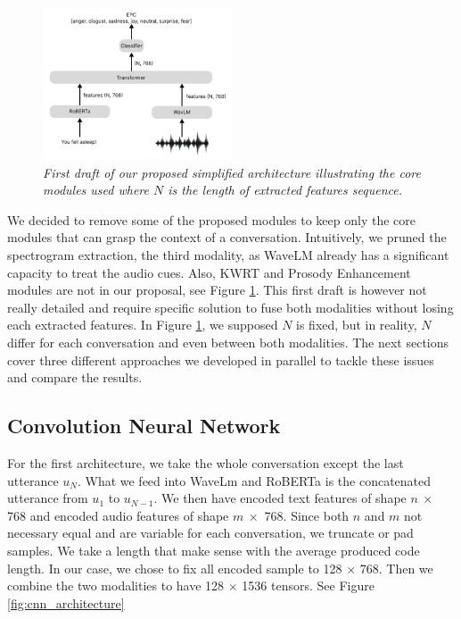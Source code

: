 \documentclass{article}
\begin{document}
\begin{figure}[htbp]
  \centering
  \includegraphics[width=0.5\textwidth]{Images/architecture_draft.png}
  \caption{\textit{First draft of our proposed simplified architecture illustrating the core modules used where $N$ is the length of extracted features sequence.}}
  \label{fig:DraftArchitecture}
\end{figure}

We decided to remove some of the proposed modules to keep only the core modules that can grasp the context of a conversation. Intuitively, we pruned the spectrogram extraction, the third modality, as WaveLM already has a significant capacity to treat the audio cues.
Also, KWRT and Prosody Enhancement modules are not in our proposal, see Figure \ref{fig:DraftArchitecture}. This first draft is however not really detailed and require specific solution to fuse both modalities without losing each extracted features. In Figure \ref{fig:DraftArchitecture}, we supposed $N$ is fixed, but in reality, $N$ differ for each conversation and even between both modalities. The next sections cover three different approaches we developed in parallel to tackle these issues and compare the results.


\subsection{Convolution Neural Network}
For the first architecture, we take the whole conversation except the last utterance $u_N$. What we feed into WaveLm and RoBERTa is the concatenated utterance from $u_1$ to $u_{N-1}$.
We then have encoded text features of shape $n \ \times$ 768 and encoded audio features of shape $m \ \times$ 768. Since both $n$ and $m$ not necessary equal and are variable for each conversation, we truncate or pad samples. We take a length that make sense with the average produced code length. In our case, we chose to fix all encoded sample to 128 $\times$ 768. Then we combine the two modalities to have 128 $\times$ 1536 tensors. See Figure \ref{fig:cnn_architecture}
\end{document}
